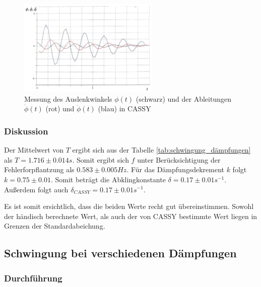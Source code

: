 \documentclass{article}
\begin{document}
\begin{figure}[H]
    \centering
    \includegraphics[width=0.6\textwidth]{bilder/eigenfreq_ableitungen_messdaten.png}
    \caption{Messung des Auslenkwinkels $\phi(t)$ (schwarz) und der Ableitungen $\dot\phi(t)$ (rot) und $\ddot\phi(t)$ (blau) in CASSY}
    \label{fig:eigenfreq_abl_messdaten}
\end{figure}

\subsubsection{Diskussion}
Der Mittelwert von $T$ ergibt sich aus der Tabelle \ref{tab:schwingung_dämpfungen} als $T = 1.716 \pm 0.014s$. Somit ergibt sich $f$ unter Berücksichtigung der
Fehlerforpflantzung als $0.583 \pm 0.005Hz$. Für das Dämpfungsdekrement $k$ folgt $k = 0.75 \pm 0.01$. Somit beträgt die Abklingkonstante $\delta = 0.17 \pm 0.01s^{-1}$.
Außerdem folgt auch $\delta_{CASSY} = 0.17 \pm 0.01s^{-1}$.

Es ist somit ersichtlich, dass die beiden Werte recht gut übereinstimmen. Sowohl der händisch berechnete Wert, als auch der von CASSY bestimmte Wert liegen in Grenzen der
Standardabeichung.

\subsection{Schwingung bei verschiedenen Dämpfungen}
\subsubsection{Durchführung}
\end{document}

